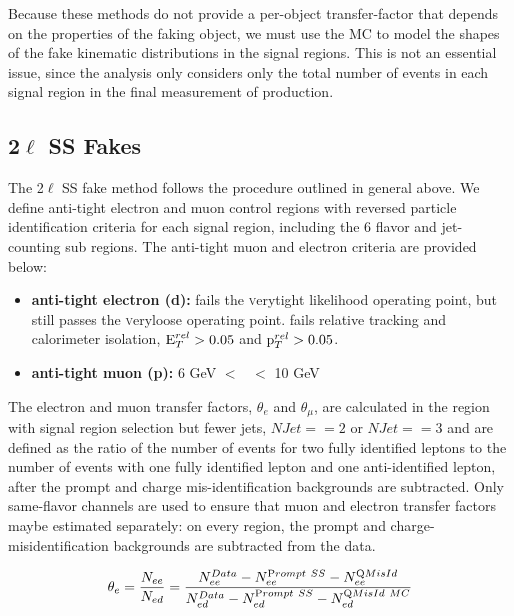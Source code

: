 Because these methods do not provide a per-object transfer-factor that depends on the properties of the faking object, we must use the MC to model the shapes of the fake kinematic distributions in the signal regions. This is not an essential issue, since the analysis only considers only the total number of events in each signal region in the final measurement of \tth production.

\subsection{2$\ell$ SS Fakes}
The 2$\ell$ SS fake method follows the procedure outlined in general above. We define anti-tight electron and muon control regions with reversed particle identification criteria for each signal region, including the 6 flavor and jet-counting sub regions. The anti-tight muon and electron criteria are provided below:
  
\begin{itemize}

\item \textbf{anti-tight electron (d):} fails the {\textsc verytight} likelihood operating point, but still passes the {\textsc veryloose} operating point. fails relative tracking and calorimeter isolation, $\rm E_{T}^{rel}>0.05$ and $\rm p_{T}^{rel}>0.05$.

\item \textbf{anti-tight muon (p):} 6 GeV $<$ \pt\ $<$ 10 GeV

\end{itemize}

The electron and muon transfer factors, $\theta_e$ and $\theta_{\mu}$, are calculated in the region with signal region selection but fewer jets, $NJet == 2$ or $NJet ==3$ and are defined as the ratio of the number of events for two fully identified leptons to the number of events with one fully identified lepton and one anti-identified lepton, after the prompt and charge mis-identification backgrounds are subtracted. Only same-flavor channels are used to ensure that muon and electron transfer factors maybe estimated separately:
on every region, the prompt and charge-misidentification backgrounds are subtracted from the data. 

 \begin{equation}
 \theta_{e} = \frac{N_{ee}}{N_{ed}}= \frac{  N^{Data}_{ee} - N^{\rm
 Prompt~SS}_{ee} - N^{\rm QMisId}_{ee} }{ N_{ed}^{Data} - N^{\rm
 Prompt~SS}_{ed} - N^{\rm QMisId~MC}_{ed} } 
\end{equation}
\label{equation:ss_def_thee}


